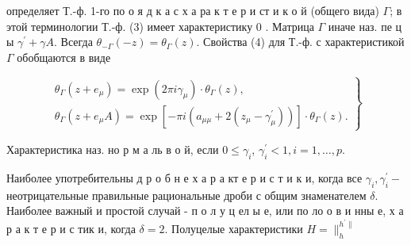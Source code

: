\documentclass[10pt]{article}
\begin{document}
определяет Т.-ф. 1-го по о я д к а с х а ра к т е р и ст и к о й (общего вида) $\Gamma$; в этой терминологии Т.-ф. (3) имеет характеристику 0 . Матрица $\Gamma$ иначе наз. пе ц ы $\gamma^{\prime}+\gamma A$. Всегда $\theta_{-\Gamma}(-z)=\theta_{\Gamma}(z)$. Свойства (4) для Т.-ф. с характеристикой $\Gamma$ обобщаются в виде



\[

\left.\begin{array}{l}

\theta_{\Gamma}\left(z+e_{\mu}\right)=\exp \left(2 \pi i \gamma_{\mu}\right) \cdot \theta_{\Gamma}(z), \\

\theta_{\Gamma}\left(z+e_{\mu} A\right)=\exp \left[-\pi i\left(a_{\mu \mu}+2\left(z_{\mu}-\gamma_{\mu}^{\prime}\right)\right)\right] \cdot \theta_{\Gamma}(z) .

\end{array}\right\}

\]



Характеристика наз. но р м а ль в о й, если $0 \leqslant \gamma_{i}$, $\gamma_{i}^{\prime}<1, i=1, \ldots, p$.



Наиболее употребительны д р о б н е х а р а кт е р и с т и к и, когда все $\gamma_{i}, \gamma_{i}^{\prime}-$ неотрицательные правильные рациональные дроби с общим знаменателем $\delta$. Наиболее важный и простой случай - п о л у ц ел ы е, или по ло о в и нны е, х а р а к т е р и с тик и, когда $\delta=2$. Полуцелые характеристики $H=\|_{h}^{h^{\prime} \|}$
\end{document}
